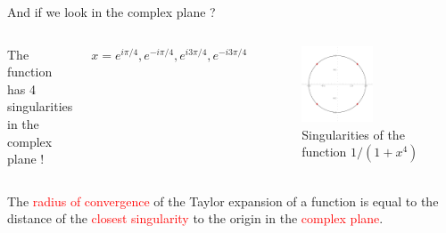 \documentclass[xcolor=x11names,compress]{beamer}
\renewcommand{\(}{\begin{columns}}
\renewcommand{\)}{\end{columns}}
\newcommand{\<}[1]{\begin{column}{#1}}
\renewcommand{\>}{\end{column}}
\begin{document}
\begin{frame}{And if we look in the complex plane ?}

\begin{columns}


\centering The function has 4 singularities in the complex plane !

\vspace{1cm}

$x = e^{i\pi/4}, e^{-i\pi/4}, e^{i3\pi/4}, e^{-i3\pi/4}$




\begin{figure}
    \centering
    \includegraphics[width=0.6\textwidth]{possingu.pdf}
    \caption{\centering Singularities of the function $1/(1+x^4)$}
    \label{fig:my_label}
\end{figure}

\end{columns}

The \textcolor{red}{radius of convergence} of the Taylor expansion of a function is equal to the distance of the \textcolor{red}{closest singularity} to the origin in the \textcolor{red}{complex plane}.
    
\end{frame}
\end{document}
